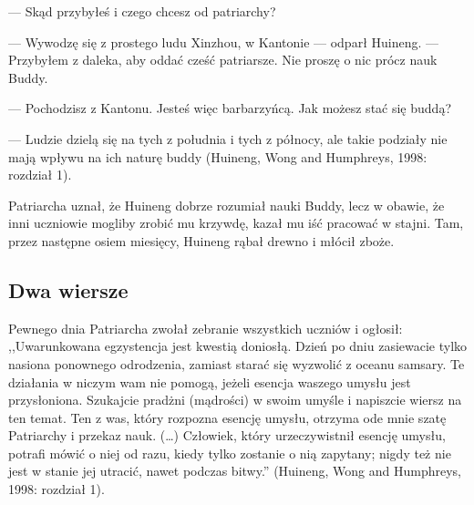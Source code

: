 --- Skąd przybyłeś i czego chcesz od patriarchy?

--- Wywodzę się z prostego ludu Xinzhou, w Kantonie --- odparł Huineng. --- Przybyłem z daleka, aby oddać cześć patriarsze. Nie proszę o nic prócz nauk Buddy.

--- Pochodzisz z Kantonu. Jesteś więc barbarzyńcą. Jak możesz stać się buddą?

--- Ludzie dzielą się na tych z południa i tych z północy, ale takie podziały nie mają wpływu na ich naturę buddy (Huineng, Wong and Humphreys, 1998: rozdział 1).

Patriarcha uznał, że Huineng dobrze rozumiał nauki Buddy, lecz w obawie, że inni uczniowie mogliby zrobić mu krzywdę, kazał mu iść pracować w stajni. Tam, przez następne osiem miesięcy, Huineng rąbał drewno i młócił zboże.

\subsection{Dwa wiersze}

Pewnego dnia Patriarcha zwołał zebranie wszystkich uczniów i ogłosił: ,,Uwarunkowana egzystencja jest kwestią doniosłą. Dzień po dniu zasiewacie tylko nasiona ponownego odrodzenia, zamiast starać się wyzwolić z oceanu samsary. Te działania w niczym wam nie pomogą, jeżeli esencja waszego umysłu jest przysłoniona. Szukajcie pradżni (mądrości) w swoim umyśle i napiszcie wiersz na ten temat. Ten z was, który rozpozna esencję umysłu, otrzyma ode mnie szatę Patriarchy i przekaz nauk. (\ldots) Człowiek, który urzeczywistnił esencję umysłu, potrafi mówić o niej od razu, kiedy tylko zostanie o nią zapytany; nigdy też nie jest w stanie jej utracić, nawet podczas bitwy.'' (Huineng, Wong and Humphreys, 1998: rozdział 1).

